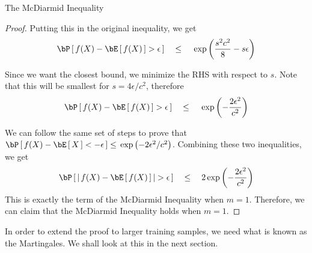 \documentclass{article}
\begin{document}
\begin{ssection}{The McDiarmid Inequality}
\begin{proof}
		Putting this in the original inequality, we get
		\begin{align*}
			\prob{f(X) - \E{f(X)} > \epsilon}	\qle	\texp{\frac{s^2 c^2}{8} - s \epsilon} 
		\end{align*}
		
		Since we want the closest bound, we minimize the RHS with respect to $s$. Note that this will be smallest for $s = 4 \epsilon / c^2$, therefore
		\begin{align*}
			\prob{f(X) - \E{f(X)} > \epsilon}	\qle	\texp{-\frac{2 \epsilon^2}{c^2}} 
		\end{align*}
		
		We can follow the same set of steps to prove that $\prob{f(X) - \E{X} < - \epsilon} \le \texp{- 2\epsilon^2 / c^2}$. Combining these two inequalities, we get
		\begin{align*}
			\prob{\abs{f(X) - \E{f(X)}} > \epsilon}	\qle	2 \texp{- \frac{2 \epsilon^2}{c^2}} 
		\end{align*}
		This is exactly the term of the McDiarmid Inequality when $m = 1$. Therefore, we can claim that the McDiarmid Inequality holds when $m = 1$.
	\end{proof}
	
	In order to extend the proof to larger training samples, we need what is known as the Martingales. We shall look at this in the next section.
	
\end{ssection}
\end{document}
